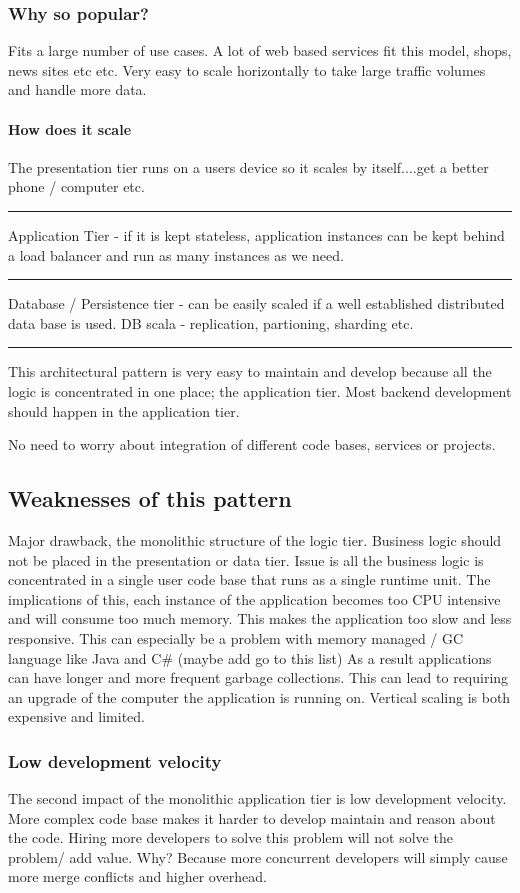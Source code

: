\documentclass[a4paper, 11pt]{book}
\begin{document}
    \subsubsection{Why so popular?}
    Fits a large number of use cases.
    A lot of web based services fit this model, shops, news sites etc etc.
    Very easy to scale horizontally to take large traffic volumes and handle more data.

    \paragraph{How does it scale}
    The presentation tier runs on a users device so it scales by itself....get a better phone / computer etc.
    \hrule
    Application Tier - if it is kept stateless, application instances can be kept behind a load balancer and run as many instances as we need.
    \hrule
    Database / Persistence tier - can be easily scaled if a well established distributed data base is used. DB scala - replication, partioning, sharding etc.

    \hrule
    This architectural pattern is very easy to maintain and develop because all the logic is concentrated in one place; the application tier.
    Most backend development should happen in the application tier.

    No need to worry about integration of different code bases, services or projects.

    \subsection{Weaknesses of this pattern}

    Major drawback, the monolithic structure of the logic tier.
    Business logic should not be placed in the presentation or data tier.
    Issue is all the business logic is concentrated in a single user code base that runs as a single runtime unit.
    The implications of this, each instance of the application becomes too CPU intensive and will consume too much memory.
    This makes the application too slow and less responsive.
    This can especially be a problem with memory managed / GC language like Java and C\# (maybe add go to this list)
    As a result applications can have longer and more frequent garbage collections.
    This can lead to requiring an upgrade of the computer the application is running on.
    Vertical scaling is both expensive and limited.

    \subsubsection{Low development velocity}
    The second impact of the monolithic application tier is low development velocity.
    More complex code base makes it harder to develop maintain and reason about the code.
    Hiring more developers to solve this problem will not solve the problem/ add value.
    Why?
    Because more concurrent developers will simply cause more merge conflicts and higher overhead.
\end{document}
